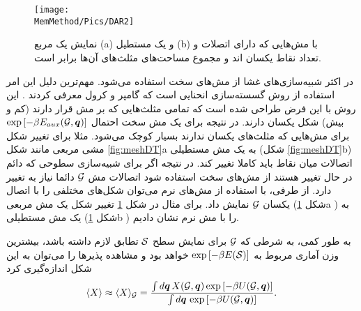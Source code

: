 \begin{figure}[h]
\begin{center}
\texttt{[image: \\MemMethod/Pics/DAR2]}
\caption{
نمایش یک مربع (a) و یک مستطیل (b) با مش‌هایی که دارای اتصلات و تعداد نقاط یکسان اند و مجموع مساحت‌های مثلث‌های آن‌ها برابر است.
}
\label{fig:meshDAR}
\end{center}
\end{figure} 




در اکثر شبیه‌سازی‌های غشا از مش‌های سخت استفاده می‌شود. مهم‌ترین دلیل این امر استفاده از روش گسسته‌سازی انحنایی است که گامپر و کرول معرفی کردند
\cite{gompperkroll1996}.
 این روش با این فرض طراحی شده است که تمامی مثلث‌هایی که بر مش قرار دارند (کم و بیش) شکل یکسان دارند. در نتیجه برای یک مش سخت احتمال
 $\exp\left[-\beta E_{aux}({\cal G}, {\bm q})\right]$
برای مش‌هایی که مثلث‌های یکسان ندارند بسیار کوچک می‌شود. مثلا برای تغییر شکل مشی مربعی مانند شکل 
\ref{fig:meshDT}a
به یک مش مستطیلی (شکل
\ref{fig:meshDT}b)
 اتصالات میان نقاط باید کاملا تغییر کند. در نتیجه اگر برای شبیه‌سازی سطوحی که دائم در حال تغییر هستند از مش‌های سخت استفاده شود اتصالات مش
$\cal G$
دائما نیاز به تغییر دارد. از طرفی، با استفاده از مش‌های نرم می‌توان شکل‌های مختلفی را با اتصال یکسان
$\cal G$
نمایش داد. برای مثال در شکل
\ref{fig:meshDAR}
تغییر شکل یک مش مربعی (شکل
\ref{fig:meshDAR}a
) به یک مش مستطیلی (شکل
\ref{fig:meshDAR}b
) را با مش نرم نشان دادیم. 

به طور کمی، به شرطی که 
${\cal G}$
برای نمایش سطح
${\cal S}$
تطابق لازم داشته باشد، بیشترین وزن آماری مربوط به 
$\exp\left[-\beta E({\cal S})\right]$
خواهد بود و مشاهده‌ پذیر‌ها را می‌توان به این شکل اندازه‌گیری کرد
\begin{equation}\label{eq:<A(M)> soft meshes}
\langle X \rangle \approx
\langle X \rangle_{\cal G} = \frac{\int d {\bm q}\, X({\cal G}, {\bm q}) \exp\left[-\beta U({\cal G}, {\bm q})\right] } 
                                                  { \int d {\bm q}\,                                \exp\left[-\beta U({\cal G}, {\bm q})\right] }.
\end{equation}















